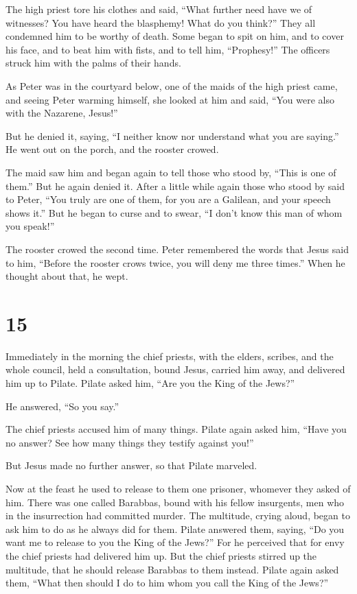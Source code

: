  The high priest tore his clothes and said, ``What further
need have we of witnesses?  You have heard the blasphemy!
What do you think?'' They all condemned him to be worthy of death.
 Some began to spit on him, and to cover his face, and to
beat him with fists, and to tell him, ``Prophesy!'' The officers struck
him with the palms of their hands.

 As Peter was in the courtyard below, one of the maids of
the high priest came,  and seeing Peter warming himself,
she looked at him and said, ``You were also with the Nazarene, Jesus!''

 But he denied it, saying, ``I neither know nor understand
what you are saying.'' He went out on the porch, and the rooster crowed.

 The maid saw him and began again to tell those who stood
by, ``This is one of them.''  But he again denied it. After
a little while again those who stood by said to Peter, ``You truly are
one of them, for you are a Galilean, and your speech shows it.''
 But he began to curse and to swear, ``I don't know this
man of whom you speak!''

 The rooster crowed the second time. Peter remembered the
words that Jesus said to him, ``Before the rooster crows twice, you will
deny me three times.'' When he thought about that, he wept.

\hypertarget{section-14}{%
\section{15}\label{section-14}}

 Immediately in the morning the chief priests, with the
elders, scribes, and the whole council, held a consultation, bound
Jesus, carried him away, and delivered him up to Pilate. 
Pilate asked him, ``Are you the King of the Jews?''

He answered, ``So you say.''

 The chief priests accused him of many things. 
Pilate again asked him, ``Have you no answer? See how many things they
testify against you!''

 But Jesus made no further answer, so that Pilate marveled.

 Now at the feast he used to release to them one prisoner,
whomever they asked of him.  There was one called Barabbas,
bound with his fellow insurgents, men who in the insurrection had
committed murder.  The multitude, crying aloud, began to ask
him to do as he always did for them.  Pilate answered them,
saying, ``Do you want me to release to you the King of the Jews?''
 For he perceived that for envy the chief priests had
delivered him up.  But the chief priests stirred up the
multitude, that he should release Barabbas to them instead.
 Pilate again asked them, ``What then should I do to him
whom you call the King of the Jews?''

